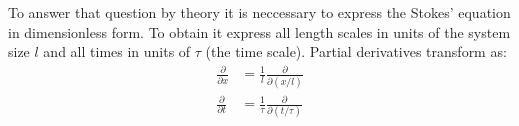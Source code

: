 To answer that question by theory it is neccessary to express the Stokes'
equation in dimensionless form. To obtain it express all length scales in units
of the system size $l$ and all times in units of $\tau$ (the time scale).
Partial derivatives transform as:
\begin{align*}
	\frac{\partial}{\partial x} &= \frac{1}{l}\frac{\partial}{\partial (x/l)}\\
	\frac{\partial}{\partial t} &= \frac{1}{\tau}\frac{\partial}{\partial
(t/\tau)}
\end{align*}
